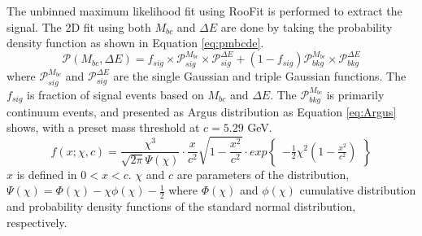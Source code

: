 The unbinned maximum likelihood fit using RooFit is performed to extract the signal. The 2D fit using both $M_{bc}$ and $\Delta{E}$ are done by taking the probability density function as shown in Equation \ref{eq:pmbcde}.
\begin{equation}\label{eq:pmbcde}
\mathcal{P}(M_{bc},\Delta{E}) = 
f_{sig}\times \mathcal{P}_{sig}^{M_{bc}}\times\mathcal{P}_{sig}^{\Delta{E}}
+ 
(1-f_{sig})\mathcal{P}_{bkg}^{M_{bc}}\times\mathcal{P}_{bkg}^{\Delta{E}}
\end{equation}
where $\mathcal{P}_{sig}^{M_{bc}}$ and $\mathcal{P}_{sig}^{\Delta{E}}$ are the single Gaussian and triple Gaussian functions. The $f_{sig}$ is fraction of signal events based on $M_{bc}$ and $\Delta E$. The $\mathcal{P}_{bkg}^{M_{bc}}$ is  primarily continuum events, and presented as Argus distribution as Equation \ref{eq:Argus} shows, with a preset mass threshold at $c = 5.29$ GeV. 
\begin{equation}\label{eq:Argus}
f(x;\chi,c)=\frac{\chi^3}{\sqrt{2\pi}\Psi(\chi)}\cdot
\frac{x}{c^2}\sqrt{1-\frac{x^2}{c^2}}\cdot
exp\begin{Bmatrix}
-\frac{1}{2}\chi^2(1-\frac{x^2}{c^2})
\end{Bmatrix}
\end{equation}
 $x$ is defined in $0<x<c$. $\chi$ and $c$ are parameters of the distribution, $\Psi(\chi)=\Phi(\chi)-\chi\phi(\chi)-\frac{1}{2}$ where $\Phi(\chi)$ and $\phi(\chi)$  cumulative distribution and probability density functions of the standard normal distribution, respectively. 
 
